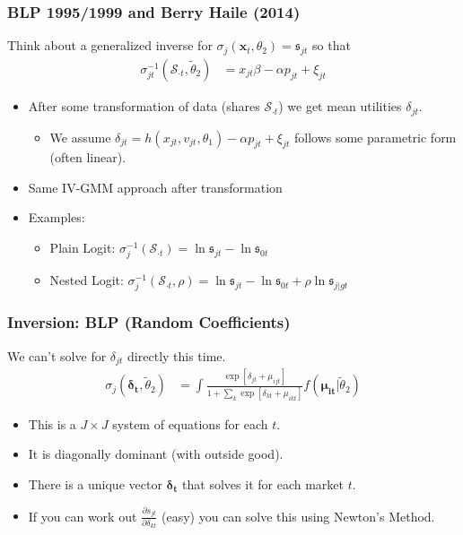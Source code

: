 \begin{frame}
\frametitle{BLP 1995/1999 and Berry Haile (2014)}
Think about a \alert{generalized inverse} for $\sigma_{j}(\mathbf{x}_t,\theta_2) = \mathfrak{s}_{jt}$ so that 
\begin{align*}
 \sigma_{jt}^{-1}(\mathcal{S}_{\cdot t},\widetilde{\theta}_2)&= x_{jt} \beta -\alpha p_{jt} +  \xi_{jt} 
\end{align*}
 \begin{itemize}
\item After some transformation of data (shares $\mathcal{S}_{\cdot t}$) we get \alert{mean utilities} $\delta_{jt}$.
\begin{itemize}
\item We assume $\delta_{jt}=h(x_{jt},v_{jt},\theta_1) -\alpha p_{jt} + \xi_{jt}$ follows some parametric form (often linear).
 \end{itemize}
\item Same IV-GMM approach after transformation
\item Examples:
\begin{itemize}
\item Plain Logit: $\sigma_{j}^{-1}(\mathcal{S}_{\cdot t}) = \ln \mathfrak{s}_{jt}- \ln \mathfrak{s}_{0t}$
\item Nested Logit: $\sigma_{j}^{-1}(\mathcal{S}_{\cdot t},\rho) = \ln \mathfrak{s}_{jt}- \ln \mathfrak{s}_{0t} + \rho  \ln \mathfrak{s}_{j|gt}$
 \end{itemize}
 \end{itemize}
\end{frame}


\begin{frame}
\frametitle{Inversion: BLP (Random Coefficients)}
We can't solve for $\delta_{jt}$ directly this time.
\begin{align*}
\sigma_{j}(\boldsymbol{\delta_{t}},\widetilde{\theta}_2) &= \int \frac{\exp[\delta_{jt} + \mu_{ijt} ]}{1+\sum_k \exp[\delta_{kt} +  \mu_{ikt}  ]} f(\boldsymbol{\mu_{it}} | \widetilde{\theta}_2)
\end{align*}
 \begin{itemize}
 \item This is a $J \times J$ system of equations for each $t$.
 \item It is diagonally dominant (with outside good).
 \item There is a unique vector $\boldsymbol{\delta_{t}}$ that solves it for each market $t$.
 \item If you can work out $\frac{\partial s_{jt}}{\partial \delta_{kt}}$ (easy) you can solve this using Newton's Method.
 \end{itemize}
\end{frame}


